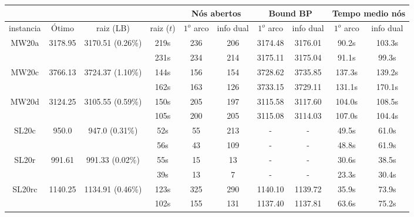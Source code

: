 \documentclass[12pt]{article}
\begin{document}
\begin{table}[h]
\centering
\footnotesize
\begin{tabular}{|c|c|c|c|c|c|c|c|c|c|}
\cline{5-10}
\multicolumn{1}{c}{} & \multicolumn{1}{c}{} & \multicolumn{1}{c}{} & \multicolumn{1}{c}{} & \multicolumn{2}{|c|}{N\'os abertos} & \multicolumn{2}{c|}{Bound BP} & \multicolumn{2}{c|}{Tempo medio n\'os} \\
\hline
instancia & \'Otimo & raiz (LB) & raiz ($t$) & $1^o$ arco & info dual & $1^o$ arco & info dual & $1^o$ arco & info dual \\
\hline
\multirow{2}{*}{MW20a} & \multirow{2}{*}{3178.95} & \multirow{2}{*}{3170.51 (0.26\%)}
& 219s & 236 & 206 & 3174.48 & 3176.01 & 90.2s & 103.3s \\ 
& & & 231s & 234 & 214 & 3175.11 & 3175.04 & 91.1s & 99.3s \\
\hline
\hline
\multirow{2}{*}{MW20c} & \multirow{2}{*}{3766.13} & \multirow{2}{*}{3724.37 (1.10\%)}
& 144s & 156 & 154 & 3728.62 & 3735.85 & 137.3s & 139.2s \\
&  &  & 162s & 163 & 126 & 3733.15 & 3729.11 & 131.1s & 170.1s \\
\hline
\hline
\multirow{2}{*}{MW20d} & \multirow{2}{*}{3124.25} & \multirow{2}{*}{3105.55 (0.59\%)}
& 150s & 205 & 197 & 3115.58 & 3117.60 & 104.0s & 108.5s \\
&  &  & 105s & 200 & 205 & 3115.08 & 3114.03 & 107.0s & 104.4s \\
\hline
\hline
\multirow{2}{*}{SL20c} & \multirow{2}{*}{950.0} & \multirow{2}{*}{947.0 (0.31\%)}
& 52s & 55 & 213 & - & - & 49.5s & 61.0s \\
&  &  & 56s & 43 & 109 & - & - & 48.8s & 61.9s \\
\hline
\hline
\multirow{2}{*}{SL20r} & \multirow{2}{*}{991.61} & \multirow{2}{*}{991.33 (0.02\%)}
& 55s & 15 & 13 & - & - & 30.6s & 38.5s \\
&  &  & 39s & 13 & 7 & - & - & 23.3s & 30.4s \\
\hline
\hline
\multirow{2}{*}{SL20rc} & \multirow{2}{*}{1140.25} & \multirow{2}{*}{1134.91 (0.46\%)}
& 123s & 325 & 290 & 1140.10 & 1139.72 & 35.9s & 73.9s \\
&  &  & 102s & 155 & 131 & 1137.40 & 1137.81 & 63.6s & 75.2s \\
\hline
\end{tabular}
\end{table}
\end{document}
